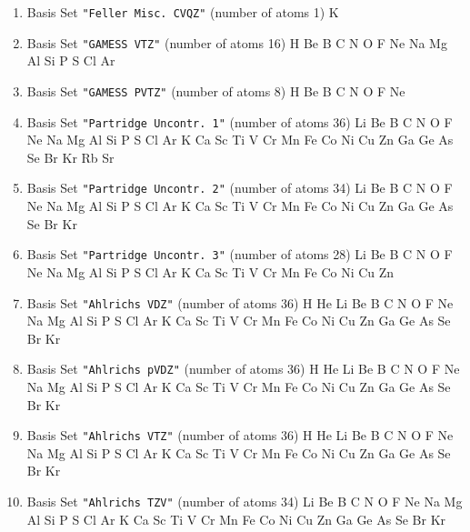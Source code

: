 \begin{enumerate}
\item Basis Set \verb#"Feller Misc. CVQZ"# (number of atoms 1)  \newline
  K


\item Basis Set \verb#"GAMESS VTZ"# (number of atoms 16)  \newline
  H Be B C N O F Ne Na Mg Al Si P S Cl Ar

\item Basis Set \verb#"GAMESS PVTZ"# (number of atoms 8)  \newline
  H Be B C N O F Ne


\item Basis Set \verb#"Partridge Uncontr. 1"# (number of atoms 36)  \newline
  Li Be B C N O F Ne Na Mg Al Si P S Cl Ar K Ca Sc Ti V Cr Mn Fe Co
 Ni Cu Zn Ga Ge As Se Br Kr Rb Sr


\item Basis Set \verb#"Partridge Uncontr. 2"# (number of atoms 34)  \newline
  Li Be B C N O F Ne Na Mg Al Si P S Cl Ar K Ca Sc Ti V Cr Mn Fe Co
 Ni Cu Zn Ga Ge As Se Br Kr


\item Basis Set \verb#"Partridge Uncontr. 3"# (number of atoms 28)  \newline
  Li Be B C N O F Ne Na Mg Al Si P S Cl Ar K Ca Sc Ti V Cr Mn Fe Co
 Ni Cu Zn


\item Basis Set \verb#"Ahlrichs VDZ"# (number of atoms 36)  \newline
  H He Li Be B C N O F Ne Na Mg Al Si P S Cl Ar K Ca Sc Ti V Cr Mn
 Fe Co Ni Cu Zn Ga Ge As Se Br Kr


\item Basis Set \verb#"Ahlrichs pVDZ"# (number of atoms 36)  \newline
  H He Li Be B C N O F Ne Na Mg Al Si P S Cl Ar K Ca Sc Ti V Cr Mn
 Fe Co Ni Cu Zn Ga Ge As Se Br Kr


\item Basis Set \verb#"Ahlrichs VTZ"# (number of atoms 36)  \newline
  H He Li Be B C N O F Ne Na Mg Al Si P S Cl Ar K Ca Sc Ti V Cr Mn
 Fe Co Ni Cu Zn Ga Ge As Se Br Kr


\item Basis Set \verb#"Ahlrichs TZV"# (number of atoms 34)  \newline
  Li Be B C N O F Ne Na Mg Al Si P S Cl Ar K Ca Sc Ti V Cr Mn Fe Co
 Ni Cu Zn Ga Ge As Se Br Kr



\end{enumerate}
